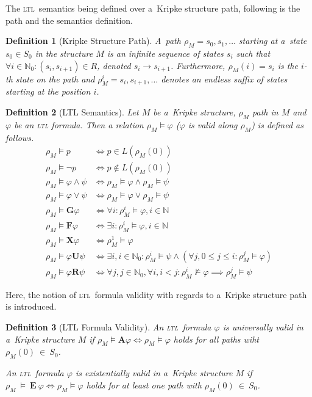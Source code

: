 \documentclass[12pt,twoside,draft]{fithesis}
\newcommand{\ltl}{\textsc{ltl}~}
\newcommand{\mNatural}{\mathbb{N}}
\newcommand{\bF}{\mathbf{F}}
\newcommand{\bG}{\mathbf{G}}
\newcommand{\bX}{\mathbf{X}}
\newcommand{\bU}{\mathbf{U}}
\newcommand{\bR}{\mathbf{R}}
\newcommand{\bA}{\mathbf{A}}
\newcommand{\bE}{\mathbf{E}}
\newtheorem{mydef}{Definition}
\begin{document}
The \ltl semantics being defined over a~Kripke structure
path\cite{clarke}, following is the path and the semantics definition.
\begin{mydef}[Kripke Structure Path]
A~path $\rho_M=s_0,s_1,\dotsc$ starting at a~state
$s_0\in S_0$ in the structure $M$ is an infinite sequence of states
$s_i$ such that $\forall i \in \mNatural_0: (s_i, s_{i+1}) \in R$,
denoted $s_i\rightarrow s_{i+1}$. 
Furthermore, $\rho_M(i)=s_i$ is the $i$-th state on the path and
$\rho_M^i=s_i,s_{i+1},\dotsc$ denotes an endless suffix of states
starting at the position $i$.
\end{mydef}

\begin{mydef}[LTL Semantics]
Let $M$ be a~Kripke structure, $\rho_M$ path in $M$ and $\varphi$ be
an \textsc{ltl} formula. Then a relation $\rho_M\models\varphi$
($\varphi$ is valid along $\rho_M$) is defined as follows\cite{clarke}.
\begin{align}
	\rho_M\models p&\iff p\in L(\rho_M(0))\\
	\rho_M\models\neg p&\iff p\notin L(\rho_M(0))\\
	\rho_M\models \varphi\wedge\psi&\iff\rho_M\models\varphi\wedge
		\rho_M\models\psi\\
	\rho_M\models \varphi\vee\psi&\iff\rho_M\models\varphi\vee
		\rho_M\models\psi\\
	\rho_M\models\bG\varphi&\iff\forall i:\rho_M^i\models\varphi,
		i\in\mNatural\\
	\rho_M\models\bF\varphi&\iff\exists i:\rho_M^i\models\varphi,
		i\in\mNatural\\
	\rho_M\models\bX\varphi&\iff\rho_M^1\models\varphi\\
	\rho_M\models\varphi\bU\psi&\iff\exists i,i\in\mNatural_0:
		\rho_M^i\models\psi\wedge(\forall j,0\leq j\leq i:
			\rho_M^j\models\varphi)\\
	\rho_M\models\varphi\bR\psi&\iff\forall j,j\in\mNatural_0,
		\forall i,i<j:\rho_M^i\not\models\varphi\implies
			\rho_M^j\models\psi
\end{align}
\end{mydef}

Here, the notion of \ltl formula validity with regards to a~Kripke
structure path is introduced.
\begin{mydef}[LTL Formula Validity]
An \ltl formula $\varphi$ is universally valid in a~Kripke structure $M$
if $\rho_M\models\bA\varphi\iff\rho_M\models\varphi$ holds for all
paths wiht $\rho_M(0)~\in~S_0$.

An \ltl formula $\varphi$ is existentially valid in a~Kripke structure
$M$ if $\rho_M~\models~\bE~\varphi\iff\rho_M\models\varphi$ holds for
at least one path with $\rho_M(0)~\in~S_0$\cite{biere}.
\end{mydef}
\end{document}
